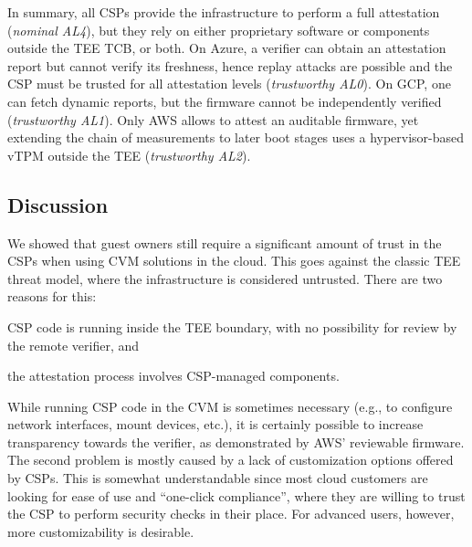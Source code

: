 In summary, all \acp{CSP} provide the infrastructure to perform a full
attestation (\emph{nominal AL4}), but they rely on either proprietary software
or components outside the \ac{TEE} TCB, or both. On Azure, a verifier can obtain
an attestation report but cannot verify its freshness, hence replay attacks are
possible and the \ac{CSP} must be trusted for all attestation levels
(\emph{trustworthy AL0}). On \ac{GCP}, one can fetch dynamic reports, but the
firmware cannot be independently verified (\emph{trustworthy AL1}). Only
\ac{AWS} allows to attest an auditable firmware, yet extending the chain of
measurements to later boot stages uses a hypervisor-based \ac{vTPM} outside the
\ac{TEE} (\emph{trustworthy AL2}).

\subsection{Discussion}

We showed that guest owners still require a significant amount of trust
in the \acp{CSP} when using \ac{CVM} solutions in the cloud. This goes against
the classic \ac{TEE} threat model, where the infrastructure is considered
untrusted. There are two reasons for this:
%
\begin{paraenum}
    \item \ac{CSP} code is running inside the \ac{TEE} boundary, with no
    possibility for review by the remote verifier, and
    \item the attestation process involves \ac{CSP}-managed components.
\end{paraenum}
%
While running \ac{CSP} code in the \ac{CVM} is sometimes necessary (e.g., to
configure network interfaces, mount devices, etc.), it is certainly possible to
increase transparency towards the verifier, as demonstrated by \ac{AWS}'
reviewable firmware. The second problem is mostly caused by a lack of
customization options offered by \acp{CSP}. This is somewhat understandable
since most cloud customers are looking for ease of use and ``one-click
compliance'', where they are willing to trust the \ac{CSP} to perform security
checks in their place. For advanced users, however, more customizability is
desirable.


